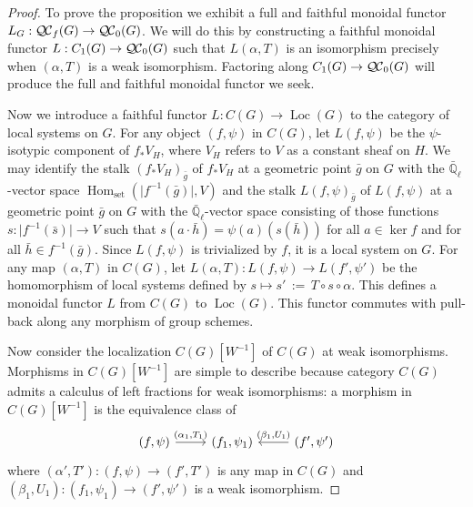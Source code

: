 \documentclass[11pt]{amsart}
\theoremstyle{plain}
\theoremstyle{definition}
\theoremstyle{remark}
\newcommand{\EE}{\mathbb{\bar Q}_\ell}
\DeclareMathOperator{\Hom}{Hom}
\newcommand{\abs}[1]{{\vert #1 \vert}}
\newcommand{\ceq}{{\, :=\, }}
\newcommand{\QC}{{\mathcal{Q\hskip-0.8pt C}}}
\newcommand{\QCb}{{\QC_0}}
\newcommand{\QCf}{{\QC_f}}
\newcommand{\Loc}{{\operatorname{Loc}}}
\begin{document}
\begin{proof}
 To prove the proposition we exhibit a full and faithful monoidal functor $L_G : \QCf(G) \to \QCb(G)$.
 We will do this by constructing a faithful monoidal functor $L : C_1(G) \to \QCb(G)$ 
 such that $L(\alpha,T)$ is an isomorphism precisely when $(\alpha,T)$ is a weak isomorphism. 
 Factoring along $C_1(G) \to \QCb(G)$ will produce the full and faithful monoidal functor we seek.

 Now we introduce a faithful functor $L : C(G) \to \Loc(G)$ to the category of local systems on $G$.
 For any object $(f,\psi)$ in $C(G)$, let $L(f,\psi)$ be the $\psi$-isotypic component of $f_* V_H$, 
 where $V_H$ refers to $V$ as a constant sheaf on $H$. 
 We may identify the stalk $(f_* V_H)_{\bar g}$ of $f_* V_H$ at a geometric point ${\bar g}$ on $G$ 
 with the $\EE$-vector space $\Hom_\text{set}(\abs{f^{-1}({\bar g})},V)$ 
 and the stalk $L(f,\psi)_{\bar g}$ of $L(f,\psi)$ at a geometric point ${\bar g}$ on $G$ 
 with the $\EE$-vector space consisting of those functions $s: \abs{f^{-1}({\bar s})} \to V$ such that 
 $s(a\cdot {\bar h}) = \psi(a)(s({\bar h}))$ for all $a\in \ker f$ and for all ${\bar h} \in f^{-1}({\bar g})$.
 Since $L(f,\psi)$ is trivialized by $f$, it is a local system on $G$.
 For any map $(\alpha,T)$ in $C(G)$, let $L(\alpha,T) : L(f,\psi) \to L(f',\psi')$ be the homomorphism of local systems defined 
 by $s \mapsto s' \ceq T\circ s\circ \alpha$. 
 This defines a monoidal functor $L$ from $C(G)$ to $\Loc(G)$. 
 This functor commutes with pull-back along any morphism of group schemes.
  
 Now consider the localization $C(G)[W^{-1}]$ of $C(G)$ at weak isomorphisms.
 Morphisms in $C(G)[W^{-1}]$ are simple to describe because category $C(G)$ 
 admits a calculus of left fractions
 for weak isomorphisms:
 a morphism in $C(G)[W^{-1}]$ is the equivalence class of 
  \begin{equation}\label{eq:morGCf}
   \begin{tikzcd}
   (f,\psi) \arrow{r}{(\alpha_1,T_1)} & (f_1,\psi_1) & \arrow[swap]{l}{(\beta_1,U_1)} (f',\psi')
   \end{tikzcd}
  \end{equation}
 where $(\alpha',T') : (f,\psi) \to (f',T')$ is any map in $C(G)$ 
 and $(\beta_1,U_1) : (f_1,\psi_1) \to (f',\psi')$ is a weak isomorphism.


\end{proof}
\end{document}
